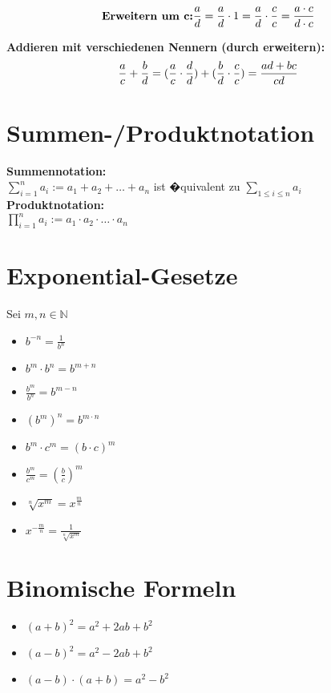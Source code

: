   \begin{equation}
  \textbf{Erweitern um c:}
  \begin{aligned}
  \frac{a}{d} = \frac{a}{d} \cdot 1 = \frac{a}{d} \cdot \frac{c}{c} = \frac{a \cdot c}{d \cdot c}\notag
  \end{aligned}
  \end{equation}
  
  \textbf{Addieren mit verschiedenen Nennern (durch erweitern):}\\
  \begin{equation}
  \begin{aligned}
  \frac{a}{c} + \frac{b}{d} = (\frac{a}{c} \cdot \frac{d}{d}) + (\frac{b}{d} \cdot \frac{c}{c}) = \frac{ad + bc}{cd}\notag
  \end{aligned}
  \end{equation}
  
\section*{Summen-/Produktnotation}
\textbf{Summennotation:}\\
$\sum_{i=1}^{n}a_i := a_1 + a_2 + \dots + a_n$ ist �quivalent zu $\sum_{1\leq i\leq n}^{}a_i$\\
\textbf{Produktnotation:}\\
$\prod_{i=1}^{n}a_i := a_1 \cdot a_2 \cdot \dots \cdot a_n$

\section{Exponential-Gesetze}
Sei $m,n \in \mathbb{N}$\\
\begin{itemize}
  \item $b^{-n} = \frac{1}{b^n}$
  \item $b^m \cdot b^n = b^{m+n}$
  \item $\frac{b^m}{b^n} = b^{m-n}$
  \item $(b^m)^n = b^{m\cdot n}$
  \item $b^m \cdot c^m = (b\cdot c)^m$
  \item $\frac{b^m}{c^m} = (\frac{b}{c})^m$
  \item $\sqrt[n]{x^m} = x^\frac{m}{n}$
  \item $x^{-\frac{m}{n}} = \frac{1}{\sqrt[n]{x^m}}$
\end{itemize}

\section*{Binomische Formeln}
\begin{itemize}
  \item $(a + b)^2 = a^2 + 2ab + b^2$
  \item $(a - b)^2 = a^2 - 2ab + b^2$
  \item $(a - b) \cdot (a + b) = a^2 - b^2$
\end{itemize}		

